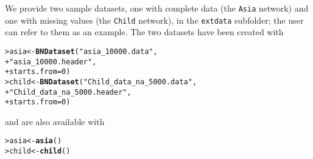 \documentclass{article}\usepackage[]{graphicx}\usepackage[]{color}
\makeatletter
\newcommand{\hlnum}[1]{\textcolor[rgb]{0.686,0.059,0.569}{#1}}%
\newcommand{\hlstr}[1]{\textcolor[rgb]{0.192,0.494,0.8}{#1}}%
\newcommand{\hlstd}[1]{\textcolor[rgb]{0.345,0.345,0.345}{#1}}%
\newcommand{\hlkwb}[1]{\textcolor[rgb]{0.69,0.353,0.396}{#1}}%
\newcommand{\hlkwc}[1]{\textcolor[rgb]{0.333,0.667,0.333}{#1}}%
\newcommand{\hlkwd}[1]{\textcolor[rgb]{0.737,0.353,0.396}{\textbf{#1}}}%
\newenvironment{kframe}{%
 \def\at@end@of@kframe{}%
 \ifinner\ifhmode%
  \def\at@end@of@kframe{\end{minipage}}%
  \begin{minipage}{\columnwidth}%
 \fi\fi%
 \def\FrameCommand##1{\hskip\@totalleftmargin \hskip-\fboxsep
 \colorbox{shadecolor}{##1}\hskip-\fboxsep
     \hskip-\linewidth \hskip-\@totalleftmargin \hskip\columnwidth}%
 \MakeFramed {\advance\hsize-\width
   \@totalleftmargin\z@ \linewidth\hsize
   \@setminipage}}%
 {\par\unskip\endMakeFramed%
 \at@end@of@kframe}
\newenvironment{knitrout}{}{} %
\makeatother
\begin{document}
We provide two sample datasets, one with complete data (the \texttt{Asia} network) and one with missing values
(the \texttt{Child} network), in the \texttt{extdata} subfolder;
the user can refer to them as an example. The two datasets have been created with

\begin{knitrout}
\color{fgcolor}\begin{kframe}
\begin{alltt}
\hlstd{> }\hlstd{asia} \hlkwb{<-} \hlkwd{BNDataset}\hlstd{(}\hlstr{"asia_10000.data"}\hlstd{,}
\hlstd{+ }                  \hlstr{"asia_10000.header"}\hlstd{,}
\hlstd{+ }                  \hlkwc{starts.from}\hlstd{=}\hlnum{0}\hlstd{)}
\hlstd{> }\hlstd{child} \hlkwb{<-} \hlkwd{BNDataset}\hlstd{(}\hlstr{"Child_data_na_5000.data"}\hlstd{,}
\hlstd{+ }                   \hlstr{"Child_data_na_5000.header"}\hlstd{,}
\hlstd{+ }                   \hlkwc{starts.from}\hlstd{=}\hlnum{0}\hlstd{)}
\end{alltt}
\end{kframe}
\end{knitrout}

and are also available with

\begin{knitrout}
\color{fgcolor}\begin{kframe}
\begin{alltt}
\hlstd{> }\hlstd{asia}  \hlkwb{<-} \hlkwd{asia}\hlstd{()}
\hlstd{> }\hlstd{child} \hlkwb{<-} \hlkwd{child}\hlstd{()}
\end{alltt}
\end{kframe}
\end{knitrout}
\end{document}
